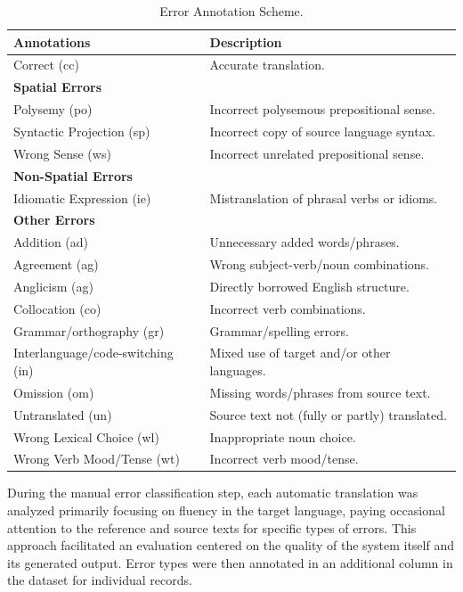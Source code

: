 \begin{table}[htb]
\centering
\small
\begin{tabular}{lp{}}
\toprule
\textbf{Annotations} & \textbf{Description} \\
\midrule
\quad Correct (cc) & Accurate translation. \\
\midrule
\quad \textbf{Spatial Errors} & \\
\quad \quad Polysemy (po) & Incorrect polysemous prepositional sense. \\
\quad \quad Syntactic Projection (sp) & Incorrect copy of source language syntax.  \\
\quad \quad Wrong Sense (ws) & Incorrect unrelated prepositional sense. \\
\midrule
\quad \textbf{Non-Spatial Errors} &  \\
\quad \quad Idiomatic Expression (ie) & Mistranslation of phrasal verbs or idioms. \\
\midrule
\quad \textbf{Other Errors} &  \\
\quad \quad Addition (ad) & Unnecessary added words/phrases.  \\
\quad \quad Agreement (ag) & Wrong subject-verb/noun combinations.  \\
\quad \quad Anglicism (ag) & Directly borrowed English structure.  \\
\quad \quad Collocation (co) & Incorrect verb combinations.  \\
\quad \quad Grammar/orthography (gr) &  Grammar/spelling errors.  \\
\quad \quad Interlanguage/code-switching (in) & Mixed use of target and/or other languages.  \\
\quad \quad Omission (om) & Missing words/phrases from source text.\\
\quad \quad Untranslated (un) & Source text not (fully or partly) translated. \\
\quad \quad Wrong Lexical Choice (wl) & Inappropriate noun choice. \\
\quad \quad Wrong Verb Mood/Tense (wt) & Incorrect verb mood/tense. \\
\bottomrule
\end{tabular}
\caption{Error Annotation Scheme.}
\label{tab: error_categories}
\end{table}


During the manual error classification step, each automatic translation was analyzed primarily focusing on fluency in the target language, paying occasional attention to the reference and source texts for specific types of errors. This approach facilitated an evaluation centered on the quality of the system itself and its generated output. Error types were then annotated in an additional column in the dataset for individual records.

